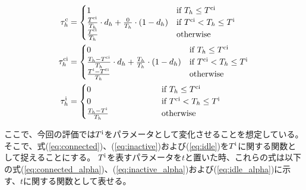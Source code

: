 \documentclass[a4j]{ujarticle}
\begin{document}
\begin{align}
	\tau^{\rm c}_h & =
	\begin{cases}
    1 \hphantom{100000000000000} & \text{if $T_h \le T^{\rm ci}$}\\
    \frac{T^{\rm ci}}{T_h} \cdot d_h + \frac{0}{T_h} \cdot (1 - d_h)& \text{if $T^{\rm ci} < T_h \le T^{\rm i}$}\\
    \frac{T^{\rm ci}}{T_h} & \text{otherwise}
  \end{cases} \label{eq:connected}\\
	\tau^{\rm ci}_h & =
  \begin{cases}
    0 \hphantom{100000000000000} & \text{if $T_h \le T^{\rm ci}$}\\
		\frac{T_h - T^{\rm ci}}{T_h} \cdot d_h + \frac{T_h}{T_h} \cdot (1 - d_h) & \text{if $T^{\rm ci} < T_h \le T^{\rm i}$}\\
    \frac{T^{\rm i} - T^{\rm ci}}{T_h} & \text{otherwise}
  \end{cases} \label{eq:inactive}\\
	\tau^{\rm i}_h & =
  \begin{cases}
    0 \hphantom{100000000000000} & \text{if $T_h \le T^{\rm ci}$}\\
		0 & \text{if $T^{\rm ci} < T_h \le T^{\rm i}$}\\
    \frac{T_h - T^{\rm i}}{T_h} & \text{otherwise}
  \end{cases}\label{eq:idle}
\end{align}

ここで、今回の評価では$T^{\rm i}$をパラメータとして変化させることを想定している。
そこで、式(\ref{eq:connected})、(\ref{eq:inactive})および(\ref{eq:idle})を$T^{\rm i}$に関する関数として捉えることにする。
$T^{\rm i}$を表すパラメータを$t$と置いた時、これらの式は以下の式(\ref{eq:connected_alpha})、(\ref{eq:inactive_alpha})および(\ref{eq:idle_alpha})に示す、$t$に関する関数として表せる。
\end{document}
